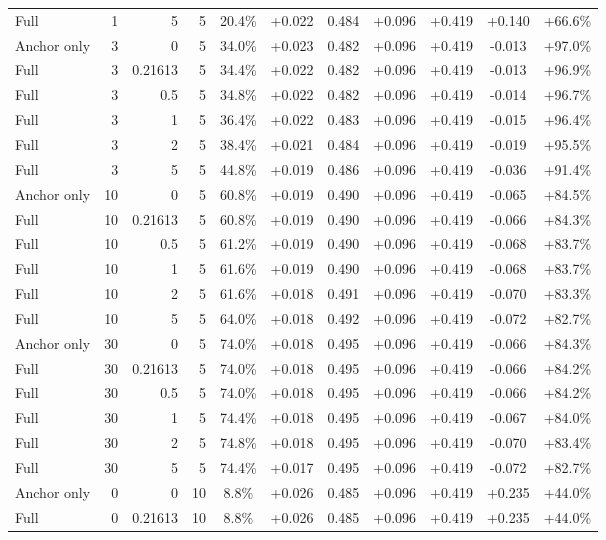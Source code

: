 \begin{table}[htbp]
\begin{tabular}{lrrrccccccc}
Full & 1 & 5 & 5 & 20.4\% & +0.022 & 0.484 & +0.096 & +0.419 & +0.140 & +66.6\% \\
Anchor only & 3 & 0 & 5 & 34.0\% & +0.023 & 0.482 & +0.096 & +0.419 & -0.013 & +97.0\% \\
Full & 3 & 0.21613 & 5 & 34.4\% & +0.022 & 0.482 & +0.096 & +0.419 & -0.013 & +96.9\% \\
Full & 3 & 0.5 & 5 & 34.8\% & +0.022 & 0.482 & +0.096 & +0.419 & -0.014 & +96.7\% \\
Full & 3 & 1 & 5 & 36.4\% & +0.022 & 0.483 & +0.096 & +0.419 & -0.015 & +96.4\% \\
Full & 3 & 2 & 5 & 38.4\% & +0.021 & 0.484 & +0.096 & +0.419 & -0.019 & +95.5\% \\
Full & 3 & 5 & 5 & 44.8\% & +0.019 & 0.486 & +0.096 & +0.419 & -0.036 & +91.4\% \\
Anchor only & 10 & 0 & 5 & 60.8\% & +0.019 & 0.490 & +0.096 & +0.419 & -0.065 & +84.5\% \\
Full & 10 & 0.21613 & 5 & 60.8\% & +0.019 & 0.490 & +0.096 & +0.419 & -0.066 & +84.3\% \\
Full & 10 & 0.5 & 5 & 61.2\% & +0.019 & 0.490 & +0.096 & +0.419 & -0.068 & +83.7\% \\
Full & 10 & 1 & 5 & 61.6\% & +0.019 & 0.490 & +0.096 & +0.419 & -0.068 & +83.7\% \\
Full & 10 & 2 & 5 & 61.6\% & +0.018 & 0.491 & +0.096 & +0.419 & -0.070 & +83.3\% \\
Full & 10 & 5 & 5 & 64.0\% & +0.018 & 0.492 & +0.096 & +0.419 & -0.072 & +82.7\% \\
Anchor only & 30 & 0 & 5 & 74.0\% & +0.018 & 0.495 & +0.096 & +0.419 & -0.066 & +84.3\% \\
Full & 30 & 0.21613 & 5 & 74.0\% & +0.018 & 0.495 & +0.096 & +0.419 & -0.066 & +84.2\% \\
Full & 30 & 0.5 & 5 & 74.0\% & +0.018 & 0.495 & +0.096 & +0.419 & -0.066 & +84.2\% \\
Full & 30 & 1 & 5 & 74.4\% & +0.018 & 0.495 & +0.096 & +0.419 & -0.067 & +84.0\% \\
Full & 30 & 2 & 5 & 74.8\% & +0.018 & 0.495 & +0.096 & +0.419 & -0.070 & +83.4\% \\
Full & 30 & 5 & 5 & 74.4\% & +0.017 & 0.495 & +0.096 & +0.419 & -0.072 & +82.7\% \\
Anchor only & 0 & 0 & 10 & 8.8\% & +0.026 & 0.485 & +0.096 & +0.419 & +0.235 & +44.0\% \\
Full & 0 & 0.21613 & 10 & 8.8\% & +0.026 & 0.485 & +0.096 & +0.419 & +0.235 & +44.0\% \\

\end{tabular}
\end{table}
